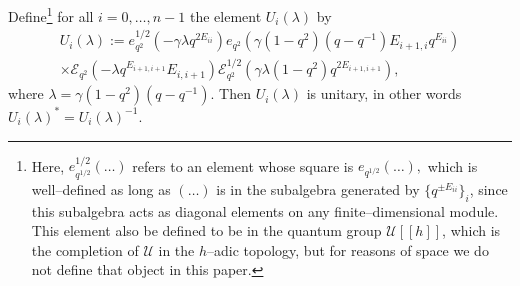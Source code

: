 \documentclass{ximera}
\begin{document}
\begin{lemma}
Define\footnote{Here, $e_{q^{1/2}}^{1/2}(\ldots)$ refers to an element whose square is $e_{q^{1/2}}(\ldots),$ which is well--defined as long as $(\ldots)$ is in the subalgebra generated by $\{q^{\pm E_{ii}}\}_i$, since this subalgebra acts as diagonal elements on any finite--dimensional module. This element also be defined to be in the quantum group $\mathcal{U}[[h]]$, which is the completion of $\mathcal{U}$ in the $h$--adic topology, but for reasons of space we do not define that object in this paper. } for all $i=0, \ldots, n-1$ the element $U_i(\lambda)$ by 
\begin{multline*}
U_i(\lambda):=
 {e}_{q^2}^{1/2}\left( -\gamma \lambda q^{2E_{ii}}\right) 
{e}_{q^2} \left(\gamma(1-q^2)(q-q^{-1})E_{i+1,i}q^{E_{ii}}\right) \\
\times
\mathcal{E}_{q^2}(-\lambda q^{E_{i+1,i+1}}E_{i,i+1}) 
 \mathcal{E}_{q^2}^{1 / 2}\left( \gamma \lambda(1-q^2){q^{2E_{i+1,i+1}}}  \right)   ,
\end{multline*}
where $\lambda = \gamma(1-q^2)(q-q^{-1})$.
Then $U_i(\lambda)$ is unitary, in other words $U_i(\lambda)^*=U_i(\lambda)^{-1}$.

\end{lemma}
\end{document}
